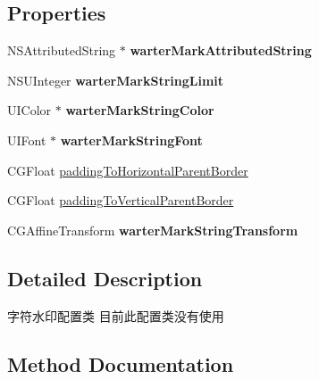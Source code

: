 \subsection*{Properties}
\begin{DoxyCompactItemize}
\item 
\mbox{\label{interface_u_m_social_string_warter_mark_config_a6e86c77e2d05a3d35cdd4aefa0c44344}} 
N\+S\+Attributed\+String $\ast$ {\bfseries warter\+Mark\+Attributed\+String}
\item 
\mbox{\label{interface_u_m_social_string_warter_mark_config_a2ae8ad4a83cf599b01e15a85d3f8ed2e}} 
N\+S\+U\+Integer {\bfseries warter\+Mark\+String\+Limit}
\item 
\mbox{\label{interface_u_m_social_string_warter_mark_config_aeb2dea1c4305a027162c9c24d9f4f3f7}} 
U\+I\+Color $\ast$ {\bfseries warter\+Mark\+String\+Color}
\item 
\mbox{\label{interface_u_m_social_string_warter_mark_config_aca225424dd42c1ae548df3e4afe9ac94}} 
U\+I\+Font $\ast$ {\bfseries warter\+Mark\+String\+Font}
\item 
C\+G\+Float \mbox{\hyperlink{interface_u_m_social_string_warter_mark_config_a2fc1ff5744c7f1b2e6579cca0e39ca2c}{padding\+To\+Horizontal\+Parent\+Border}}
\item 
C\+G\+Float \mbox{\hyperlink{interface_u_m_social_string_warter_mark_config_aa44b8fc5deafd39153db4469e253cd9d}{padding\+To\+Vertical\+Parent\+Border}}
\item 
\mbox{\label{interface_u_m_social_string_warter_mark_config_af0e0a86f43528dfffe1303cea0107d64}} 
C\+G\+Affine\+Transform {\bfseries warter\+Mark\+String\+Transform}
\end{DoxyCompactItemize}


\subsection{Detailed Description}
字符水印配置类 目前此配置类没有使用 

\subsection{Method Documentation}
\mbox{\label{interface_u_m_social_string_warter_mark_config_a7284dde6cdcdaf49bf461e37012a1014}} 
